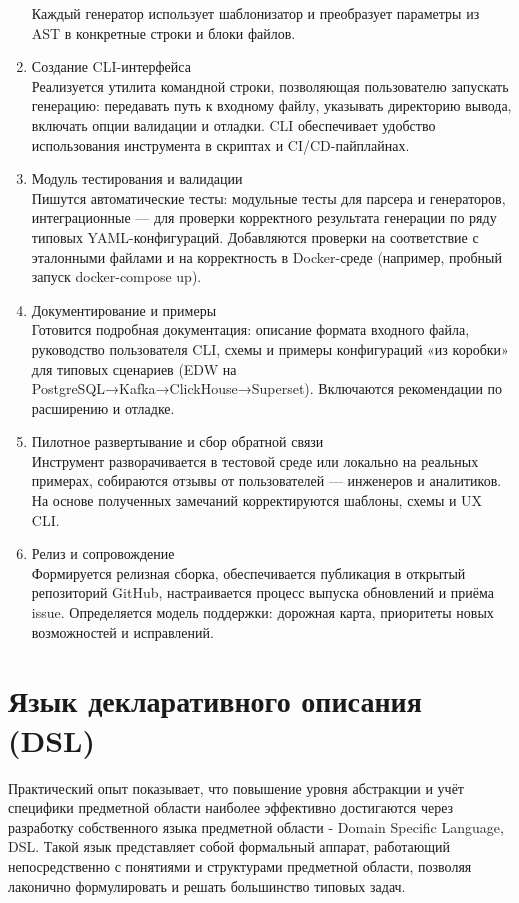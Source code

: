 \begin{enumerate}[label=\textbf{Этап \arabic*.}]
            Каждый генератор использует шаблонизатор и преобразует параметры из AST в конкретные строки и блоки файлов.
      \item Создание CLI-интерфейса\\
            Реализуется утилита командной строки, позволяющая пользователю запускать генерацию: передавать путь к входному файлу,  указывать директорию вывода, включать опции валидации и отладки. CLI обеспечивает удобство использования инструмента в скриптах и CI/CD-пайплайнах\cite{acid}.
      \item Модуль тестирования и валидации\\
            Пишутся автоматические тесты: модульные тесты для парсера и генераторов, интеграционные — для проверки корректного результата генерации по ряду типовых YAML-конфигураций. Добавляются проверки на соответствие с эталонными файлами и на корректность в Docker-среде (например, пробный запуск docker-compose up).
      \item Документирование и примеры\\
            Готовится подробная документация: описание формата входного файла, руководство пользователя CLI, схемы и примеры конфигураций «из коробки» для типовых сценариев (EDW на PostgreSQL→Kafka→ClickHouse→Superset). Включаются рекомендации по расширению и отладке.
      \item Пилотное развертывание и сбор обратной связи\\
            Инструмент разворачивается в тестовой среде или локально на реальных примерах, собираются отзывы от пользователей — инженеров и аналитиков. На основе полученных замечаний корректируются шаблоны, схемы и UX CLI.
      \item Релиз и сопровождение\\
            Формируется релизная сборка, обеспечивается публикация в открытый репозиторий GitHub, настраивается процесс выпуска обновлений и приёма issue. Определяется модель поддержки: дорожная карта, приоритеты новых возможностей и исправлений.
\end{enumerate}


\section{Язык декларативного описания (DSL)} \label{ch3:dsl}
Практический опыт показывает, что повышение уровня абстракции и учёт специфики предметной области наиболее эффективно достигаются через разработку собственного языка предметной области - Domain Specific Language, DSL\cite{novikov_grammatik}\cite{ulman}. Такой язык представляет собой формальный аппарат, работающий непосредственно с понятиями и структурами предметной области, позволяя лаконично формулировать и решать большинство типовых задач.

